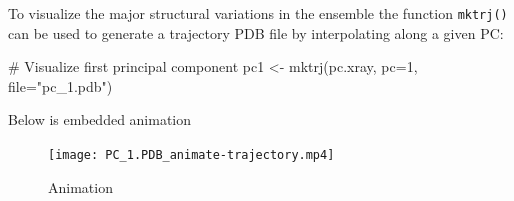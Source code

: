 \documentclass[
  letterpaper,
  DIV=11,
  numbers=noendperiod]{scrartcl}
\newenvironment{Shaded}{\begin{snugshade}}{\end{snugshade}}
\newcommand{\AttributeTok}[1]{\textcolor[rgb]{0.40,0.45,0.13}{#1}}
\newcommand{\CommentTok}[1]{\textcolor[rgb]{0.37,0.37,0.37}{#1}}
\newcommand{\DecValTok}[1]{\textcolor[rgb]{0.68,0.00,0.00}{#1}}
\newcommand{\FunctionTok}[1]{\textcolor[rgb]{0.28,0.35,0.67}{#1}}
\newcommand{\NormalTok}[1]{\textcolor[rgb]{0.00,0.23,0.31}{#1}}
\newcommand{\OtherTok}[1]{\textcolor[rgb]{0.00,0.23,0.31}{#1}}
\newcommand{\StringTok}[1]{\textcolor[rgb]{0.13,0.47,0.30}{#1}}
\begin{document}
To visualize the major structural variations in the ensemble the
function \texttt{mktrj()} can be used to generate a trajectory PDB file
by interpolating along a given PC:

\begin{Shaded}
\begin{Highlighting}[]
\CommentTok{\# Visualize first principal component}
\NormalTok{pc1 }\OtherTok{\textless{}{-}} \FunctionTok{mktrj}\NormalTok{(pc.xray, }\AttributeTok{pc=}\DecValTok{1}\NormalTok{, }\AttributeTok{file=}\StringTok{"pc\_1.pdb"}\NormalTok{)}
\end{Highlighting}
\end{Shaded}

Below is embedded animation

\begin{figure}

{\centering \texttt{[image: PC\_1.PDB\_animate-trajectory.mp4]}

}

\caption{Animation}

\end{figure}
\end{document}
